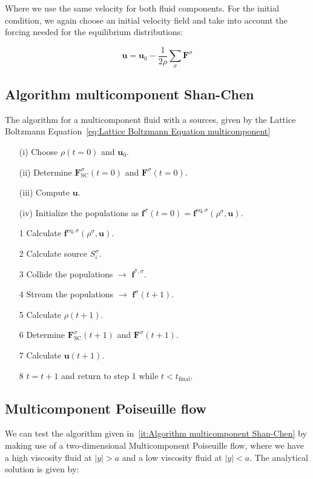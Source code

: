 Where we use the same velocity for both fluid components. For the initial condition, we again choose an initial velocity field and take into account the forcing needed for the equilibrium distributions:

\begin{equation}
    \bm{u} = \bm{u}_0 - \frac{1}{2\rho}\sum_\sigma \bm{F}^\sigma
\end{equation}

\subsection{Algorithm multicomponent Shan-Chen}
The algorithm for a multicomponent fluid with a sources, given by the Lattice Boltzmann Equation~\ref{eq:Lattice Boltzmann Equation multicomponent}

\begin{itemize}\label{it:Algorithm multicomponent Shan-Chen}
    \item[(i)] Choose $\rho(t=0)$ and $\bm{u}_0$.
    \item[(ii)] Determine $\bm{F}_{\text{SC}}^\sigma(t=0)$ and $\bm{F}^\sigma(t=0)$.
    \item[(iii)] Compute $\bm{u}$. 
    \item[(iv)] Initialize the populations as $\bm{f}^\sigma(t=0) = \bm{f}^{\text{eq}, \sigma}(\rho^\sigma, \bm{u})$. 
    \item[1] Calculate $\bm{f}^{\text{eq}, \sigma}(\rho^\sigma, \bm{u})$.
    \item[2] Calculate source $S_i^\sigma$.
    \item[3] Collide the populations $\rightarrow$ $\bm{f}^{\ast, \sigma}$.
    \item[4] Stream the populations $\rightarrow$ $\bm{f}^\sigma(t + 1)$.
    \item[5] Calculate $\rho(t + 1)$.  
    \item[6] Determine $\bm{F}_{\text{SC}}^\sigma(t+1)$ and $\bm{F}^\sigma(t+1)$.
    \item[7] Calculate $\bm{u}(t + 1)$.
    \item[8] $t = t + 1$ and return to step 1 while $t < t_{\text{final}}$.
\end{itemize}

\subsection{Multicomponent Poiseuille flow}
We can test the algorithm given in~\ref{it:Algorithm multicomponent Shan-Chen} by making use of a two-dimensional Multicomponent Poiseuille flow, where we have a high viscosity fluid at $|y| > a$ and a low viscosity fluid at $|y| < a$. The analytical solution is given by:

